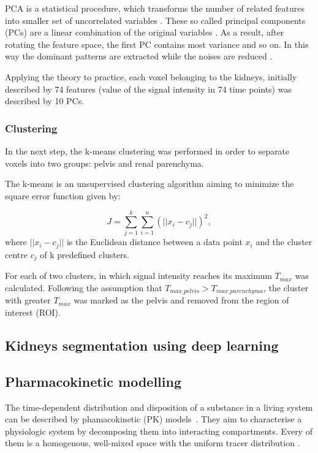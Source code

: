PCA is a statistical procedure, which transforms the number of related features into smaller set of uncorrelated variables  \cite{pca}. These so called principal components (PCs) are a linear combination of the original variables \cite{dunteman1989principal}. As a result, after rotating the feature space, the first PC contains most variance and so on. In this way the dominant patterns are extracted while the noises are reduced \cite{wold1987principal}.

Applying the theory to practice, each voxel belonging to the kidneys, initially described by 74 features (value of the signal intensity in 74 time points) was described by 10 PCs.

\subsubsection{Clustering}
In the next step, the k-means clustering \cite{kmeans} was performed in order to separate voxels into two groups: pelvis and renal parenchyma.  

The k-means is an unsupervised clustering algorithm aiming to minimize the square error function given by:

\begin{equation}
	\label{eq:kmeans}
	J = \sum_{j=1}^{k}\sum_{i=1}^{n}(||x_i-c_j||)^2,
\end{equation}
where $||x_i-c_j||$ is  the Euclidean distance between a data point $x_i$ and the cluster centre $c_j$ of k predefined clusters.

For each of two clusters, in which signal intensity reaches its maximum $T_{max}$ was calculated. 
Following the assumption that $T_{max\_pelvis}>T_{max\_parenchyma}$, the cluster with greater $T_{max}$ was marked as the pelvis and removed from the region of interest (ROI).

\subsection{Kidneys segmentation using deep learning}



\newpage
\subsection{Pharmacokinetic modelling}
The time-dependent distribution and disposition of a substance in a living system can be described by phamacokinetic (PK) models~\cite{gerlowski1983physiologically}. They aim to characterise a physiologic system by decomposing them into interacting compartments. Every of them is a homogenous, well-mixed space with the uniform tracer distribution \cite{PMID:20540902}.




